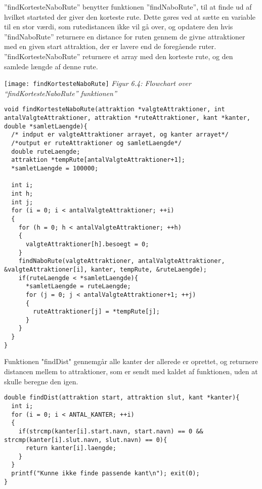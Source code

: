 ”findKortesteNaboRute” benytter funktionen ”findNaboRute”, til at finde ud af hvilket startsted der giver den korteste rute. Dette gøres ved at sætte en variable til en stor værdi, som rutedistancen ikke vil gå over, og opdatere den hvis ”findNaboRute” returnere en distance for ruten gennem de givne attraktioner med en given start attraktion, der er lavere end de foregående ruter. ”findKortesteNaboRute” returnere et array med den korteste rute, og den samlede længde af denne rute.  \newline
\begin{flushleft}
	\texttt{[image: findKortesteNaboRute]}\newline
	\textit{Figur 6.4: Flowchart over “findKortesteNaboRute” funktionen”}
\end{flushleft}
\begin{lstlisting}
void findKortesteNaboRute(attraktion *valgteAttraktioner, int antalValgteAttraktioner, attraktion *ruteAttraktioner, kant *kanter, double *samletLaengde){
  /* indput er valgteAttraktioner arrayet, og kanter arrayet*/
  /*output er ruteAttraktioner og samletLaengde*/
  double ruteLaengde;
  attraktion *tempRute[antalValgteAttraktioner+1];
  *samletLaengde = 100000;

  int i;
  int h;
  int j;
  for (i = 0; i < antalValgteAttraktioner; ++i)
  {
    for (h = 0; h < antalValgteAttraktioner; ++h)
    {
      valgteAttraktioner[h].besoegt = 0;
    }
    findNaboRute(valgteAttraktioner, antalValgteAttraktioner, &valgteAttraktioner[i], kanter, tempRute, &ruteLaengde);
    if(ruteLaengde < *samletLaengde){
      *samletLaengde = ruteLaengde;
      for (j = 0; j < antalValgteAttraktioner+1; ++j)
      {
        ruteAttraktioner[j] = *tempRute[j];
      }
    }
  }
}
\end{lstlisting}

Funktionen "findDist" gennemgår alle kanter der allerede er oprettet, og returnere distancen mellem to attraktioner, som er sendt med kaldet af funktionen, uden at skulle beregne den igen. \newline

\begin{lstlisting}
double findDist(attraktion start, attraktion slut, kant *kanter){
  int i;
  for (i = 0; i < ANTAL_KANTER; ++i)
  {
    if(strcmp(kanter[i].start.navn, start.navn) == 0 && strcmp(kanter[i].slut.navn, slut.navn) == 0){
      return kanter[i].laengde;
    }
  }
  printf("Kunne ikke finde passende kant\n"); exit(0);
}
\end{lstlisting}

